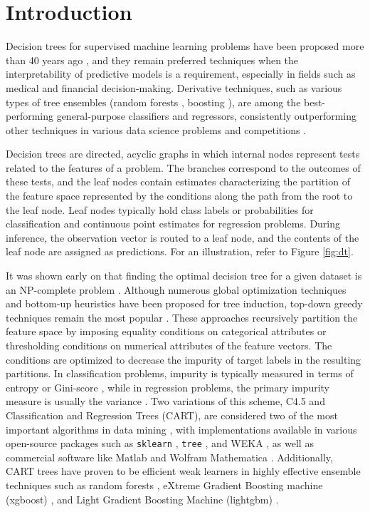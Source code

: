 \documentclass[sn-mathphys]{sn-jnl}%
\theoremstyle{thmstyleone}%
\theoremstyle{thmstyletwo}%
\theoremstyle{thmstylethree}%
\begin{document}
\section{Introduction}

Decision trees for supervised machine learning problems have been proposed more than 40 years ago \citep{chaid-earlier, id3}, and they remain preferred techniques when the interpretability of predictive models is a requirement, especially in fields such as medical \citep{dt-medicine-000, dt-medicine-001, dt-medicine-002} and financial \citep{dt-business-000, dt-business-002} decision-making. Derivative techniques, such as various types of tree ensembles (random forests \citep{rf0}, boosting \citep{xgboost, lightgbm}), are among the best-performing general-purpose classifiers and regressors, consistently outperforming other techniques in various data science problems and competitions \citep{higgs, load-forecasting}.

Decision trees are directed, acyclic graphs in which internal nodes represent tests related to the features of a problem. The branches correspond to the outcomes of these tests, and the leaf nodes contain estimates characterizing the partition of the feature space represented by the conditions along the path from the root to the leaf node. Leaf nodes typically hold class labels or probabilities for classification and continuous point estimates for regression problems. During inference, the observation vector is routed to a leaf node, and the contents of the leaf node are assigned as predictions. For an illustration, refer to Figure \ref{fig:dt}.

It was shown early on that finding the optimal decision tree for a given dataset is an NP-complete problem \citep{dt-np-complete}. Although numerous global optimization techniques \citep{evolutionary-1} and bottom-up heuristics \citep{dt-butia, dt-bottom-up} have been proposed for tree induction, top-down greedy techniques remain the most popular \citep{dt-partitioning, dt-induction}.
These approaches recursively partition the feature space by imposing equality conditions on categorical attributes or thresholding conditions on numerical attributes of the feature vectors. The conditions are optimized to decrease the impurity of target labels in the resulting partitions. In classification problems, impurity is typically measured in terms of entropy or Gini-score \citep{treebook}, while in regression problems, the primary impurity measure is usually the variance \citep{treebook}. Two variations of this scheme, C4.5 and Classification and Regression Trees (CART), are considered two of the most important algorithms in data mining \citep{top10}, with implementations available in various open-source packages such as \verb|sklearn| \citep{sklearn}, \verb|tree| \citep{tree}, and WEKA \citep{weka}, as well as commercial software like Matlab \citep{matlab} and Wolfram Mathematica \citep{mathematica}. Additionally, CART trees have proven to be efficient weak learners in highly effective ensemble techniques such as random forests \citep{rf0}, eXtreme Gradient Boosting machine (xgboost) \citep{xgboost}, and Light Gradient Boosting Machine (lightgbm) \citep{lightgbm}.
\end{document}
